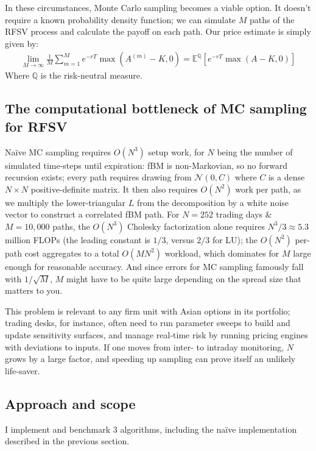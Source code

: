 \documentclass{article}
\begin{document}
 In these circumstances, Monte Carlo sampling becomes a viable option. It doesn't require a known probability density function; we can simulate $M$ paths of the RFSV process and calculate the payoff on each path. Our price estimate is simply given by:
 \begin{align}
    \lim_{M \to \infty} \frac{1}{M} \sum_{m=1}^M e^{-rT} \max\left(A^{(m)} - K, 0\right) = \mathbb{E}^{\mathbb{Q}}\left[e^{-rT} \max(A - K, 0)\right]
 \end{align}
    Where $\mathbb Q$ is the risk-neutral measure.

\subsection{The computational bottleneck of MC sampling for RFSV}
    
 Naïve MC sampling requires $O(N^3)$ setup work, for $N$ being the number of simulated time-steps until expiration: fBM is non-Markovian, so no forward recursion exists; every path requires drawing from $\mathcal{N}(0, C)$ where $C$ is a dense $N \times N$ positive-definite matrix. It then also requires $O(N^2)$ work per path, as we multiply the lower-triangular $L$ from the decomposition by a white noise vector to construct a correlated fBM path. For $N = 252$ trading days \& $M = 10{,}000$ paths, the $O(N^3)$ Cholesky factorization alone requires $N^3/3 \approx 5.3$ million FLOPs (the leading constant is $1/3$, versus $2/3$ for LU); the $O(N^2)$ per-path cost aggregates to a total $O(MN^2)$ workload, which dominates for $M$ large enough for reasonable accuracy. And since errors for MC sampling famously fall with $1/\sqrt M$, $M$ might have to be quite large depending on the spread size that matters to you.
 
This problem is relevant to any firm unit with Asian options in its portfolio; trading desks, for instance, often need to run parameter sweeps to build and update sensitivity surfaces, and manage real-time risk by running pricing engines with deviations to inputs. If one moves from inter- to intraday monitoring, $N$ grows by a large factor, and speeding up sampling can prove itself an unlikely life-saver.
  
\subsection{Approach and scope}

I implement and benchmark 3 algorithms, including the na\"ive implementation described in the previous section. 
\end{document}
